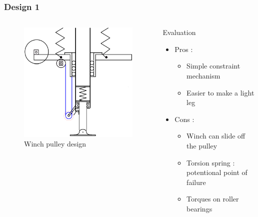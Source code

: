 \begin{frame}
\begin{columns}
\end{columns}
\end{frame}

\begin{frame}
\frametitle{Design 1}
\begin{columns}
\begin{figure}
\centering
\includegraphics[width=\textwidth]{fig/pratik_des.pdf}
\caption{Winch pulley design}
\end{figure}

\begin{block}{Evaluation}
\begin{itemize}
\item
{\greencol Pros :}\\[0.1in]
    \begin{itemize}
    \item
    Simple constraint mechanism\\[0.1in]
    \item
    Easier to make a light leg\\[0.1in]
    \end{itemize}
\item
\alert{Cons} :\\[0.1in]
    \begin{itemize}
    \item
    Winch can slide off the pulley\\[0.1in]
    \item
    Torsion spring : potentional point of failure\\[0.1in]
    \item
    Torques on roller bearings\\[0.1in]
    \end{itemize}
\end{itemize}
\end{block}
\end{columns}
\end{frame}

